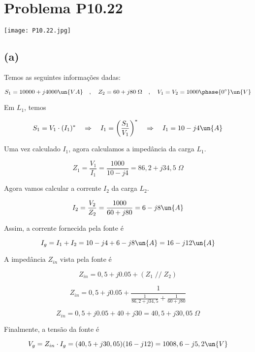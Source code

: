 
\section*{Problema P10.22}

\renewcommand*\thesection{10.22}

\begin{center}
    \texttt{[image: P10.22.jpg]}
\end{center}

\subsection*{(a)}

Temos as seguintes informações dadas:

\[ S_1 = 10000 + j4000 \un{VA} \quad , \quad Z_2 = 60 + j80 \;\Omega \quad , \quad V_1 = V_2 = 1000\phase{0^{\circ}} \un{V} \]

Em $L_1$, temos    

\[ S_1 = V_1 \cdot (I_1)^* \quad \Rightarrow \quad I_1 = \left(\frac{S_1}{V_1}\right)^* \quad \Rightarrow \quad I_1 = 10 -j4 \un{A}\]

Uma vez calculado $I_1$, agora calculamos a impedância da carga $L_1$.

\[ Z_1 = \frac{V_1}{I_1} = \frac{1000}{10 - j4} = 86,2 + j34,5 \;\Omega \]

Agora vamos calcular a corrente $I_2$ da carga $L_2$.

\[ I_2 = \frac{V_2}{Z_2} = \frac{1000}{60 + j80} = 6 - j8 \un{A}  \]



Assim, a corrente fornecida pela fonte é

\[ I_g = I_1 + I_2 = 10 -j4 +  6 - j8 \un{A} = 16 - j12 \un{A} \]

A impedância $Z_{in}$ vista pela fonte é

\[ Z_{in} = 0,5 + j0.05 + (Z_1 \; // \; Z_2) \]

\[ Z_{in} = 0,5 + j0.05 + \frac{1}{\frac{1}{86,2 + j34,5} + \frac{1}{60 + j80}} \]

\[ Z_{in} = 0,5 + j0.05 + 40 + j30 = 40,5 + j30,05 \;\Omega \]

Finalmente, a tensão da fonte é

\[ V_g = Z_{in} \cdot I_g = (40,5 + j30,05)(16 - j12) = 1008,6 - j5,2 \un{V}\]

